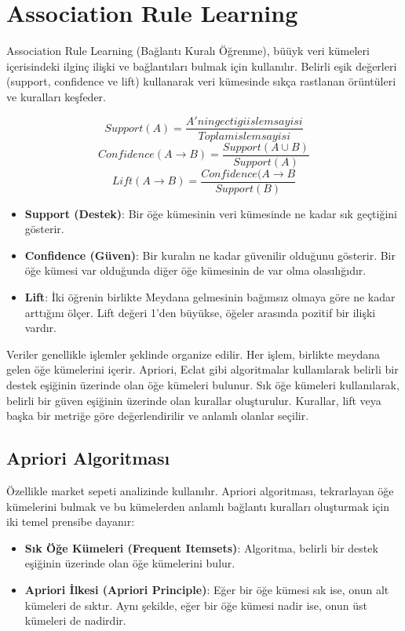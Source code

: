 \section{Association Rule Learning}

Association Rule Learning (Bağlantı Kuralı Öğrenme), büüyk veri kümeleri içerisindeki ilginç ilişki ve bağlantıları bulmak için kullanılır. Belirli eşik değerleri  (support, confidence ve lift) kullanarak veri kümesinde sıkça rastlanan örüntüleri ve kuralları keşfeder.

\[ Support(A) = \frac{A'nin gectigi islem sayisi}{Toplam islem sayisi} \]
\[ Confidence(A \rightarrow B) = \frac{Support(A \cup B)}{Support(A)} \]
\[ Lift(A \rightarrow B) = \frac{Confidence(A \rightarrow B}{Support(B)} \]

\begin{itemize}
	\item \textbf{Support (Destek)}: Bir öğe kümesinin veri kümesinde ne kadar sık geçtiğini gösterir.
	\item \textbf{Confidence (Güven)}: Bir kuralın ne kadar güvenilir olduğunu gösterir. Bir öğe kümesi var olduğunda diğer öğe kümesinin de var olma olasılığıdır.
	\item \textbf{Lift}: İki öğrenin birlikte Meydana gelmesinin bağımsız olmaya göre ne kadar arttığını ölçer. Lift değeri 1'den büyükse, öğeler arasında pozitif bir ilişki vardır.
\end{itemize}

Veriler genellikle işlemler şeklinde organize edilir. Her işlem, birlikte meydana gelen öğe kümelerini içerir. Apriori, Eclat gibi algoritmalar kullanılarak belirli bir destek eşiğinin üzerinde olan öğe kümeleri bulunur. Sık öğe kümeleri kullanılarak, belirli bir güven eşiğinin üzerinde olan kurallar oluşturulur. Kurallar, lift veya başka bir metriğe göre değerlendirilir ve anlamlı olanlar seçilir.

\newpage

\subsection{Apriori Algoritması}
Özellikle market sepeti analizinde kullanılır. Apriori algoritması, tekrarlayan öğe kümelerini bulmak ve bu kümelerden anlamlı bağlantı kuralları oluşturmak için iki temel prensibe dayanır:

\begin{itemize}
	\item \textbf{Sık Öğe Kümeleri (Frequent Itemsets)}: Algoritma, belirli bir destek eşiğinin üzerinde olan öğe kümelerini bulur.
	\item \textbf {Apriori İlkesi (Apriori Principle)}: Eğer bir öğe kümesi sık ise, onun alt kümeleri de sıktır. Aynı şekilde, eğer bir öğe kümesi nadir ise, onun üst kümeleri de nadirdir.
\end{itemize}

